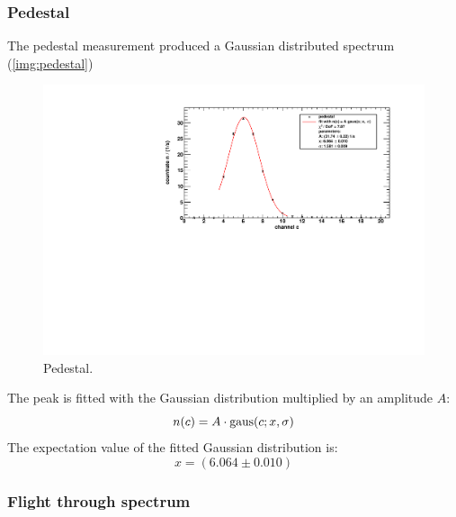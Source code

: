 \subsubsection{Pedestal}
The pedestal measurement produced a Gaussian distributed spectrum (\autoref{img:pedestal})
\begin{figure}[H]
\begin{center}
  \includegraphics[width=\textwidth]{../img/pedestal.pdf}
  \caption{Pedestal.}
  \label{img:pedestal}
\end{center}
\end{figure}
The peak is fitted with the Gaussian distribution multiplied by an amplitude $A$:
\begin{equation}
    n(c) = A \cdot \operatorname{gaus}(c;x,\sigma)
\end{equation}
The expectation value of the fitted Gaussian distribution is:
\begin{equation}
    x = (6.064 \pm 0.010)
\end{equation}

\subsubsection{Flight through spectrum}
